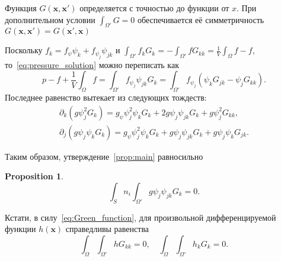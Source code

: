 \documentclass{article}
\newtheorem{proposition}{Proposition}
\newcommand{\bx}{\boldsymbol{x}}
\begin{document}
Функция \(G(\bx, \bx')\) определяется с точностью до функции от \(x\).
При дополнительном условии \(\int_{\Omega'} G = 0\)
обеспечивается её симметричность \(G(\bx, \bx') = G(\bx', \bx)\)

Поскольку \(f_k = f_\psi \psi_k + f_{\psi_j}\psi_{jk}\) и
\(\int_{\Omega'} f_k G_k = -\int_{\Omega'} f G_{kk} = \frac1V\int_\Omega f - f\),
то~\eqref{eq:pressure_solution} можно переписать как
\begin{equation}\label{eq:pressure_solution2}
    p - f + \frac1V\int_\Omega f = \int_{\Omega'} f_{\psi_j} \psi_{jk} G_k =
    \int_{\Omega'} f_{\psi_j} \left( \psi_k G_{jk} - \psi_j G_{kk} \right).
\end{equation}
Последнее равенство вытекает из следующих тождеств:
\begin{gather*}
    \partial_k\left( g\psi_j^2 G_k \right) = g_\psi \psi_j^2\psi_k G_k + 2g\psi_j\psi_{jk}G_k + g\psi_j^2 G_{kk}, \\
    \partial_j\left( g\psi_j\psi_k G_k\right) = g_\psi \psi_j^2\psi_k G_k + g\psi_j\psi_{jk}G_k + g\psi_j\psi_k G_{jk}.
\end{gather*}

Таким образом, утверждение~\ref{prop:main} равносильно
\begin{proposition}\label{prop:main2}
\begin{equation}\label{eq:forces_sum3}
    \int_S n_i \int_{\Omega'} g \psi_j \psi_{jk} G_k = 0.
\end{equation}
\end{proposition}

Кстати, в силу~\eqref{eq:Green_function}, для произвольной дифференцируемой функции \(h(\bx)\) справедливы равенства
\begin{equation}\label{eq:Green_double_integral}
    \int_\Omega \int_{\Omega'} h G_{kk} = 0, \quad
    \int_\Omega \int_{\Omega'} h_k G_k = 0.
\end{equation}
\end{document}

